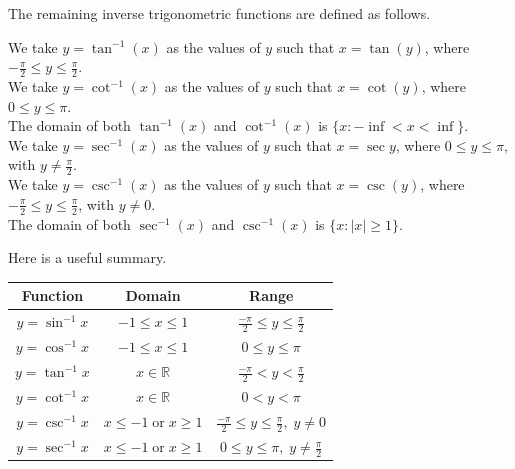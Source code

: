 \documentclass[compacto,10pt,comentarios]{aleph-notas}
\begin{document}
The remaining inverse trigonometric functions are defined as follows.
\begin{defi}
    We take $y = \tan^{-1}(x)$ as the values of $y$ such that $x = \tan(y)$, where $-\frac{\pi}{2} \leq y \leq \frac{\pi}{2}$. \\

    We take $y = \cot^{-1}(x)$ as the values of $y$ such that $x = \cot(y)$, where $0 \leq y \leq \pi$. \\

    The domain of both $\tan^{-1}(x)$ and $\cot^{-1}(x)$ is $\{ x: -\inf < x < \inf \}$. \\

    We take $y = \sec^{-1}(x)$ as the values of $y$ such that $x = \sec{y}$, where $0 \leq y \leq \pi$, with $y \neq \frac{\pi}{2}$. \\

    We take $y = \csc^{-1}(x)$ as the values of $y$ such that $x = \csc(y)$, where $-\frac{\pi}{2} \leq y \leq \frac{\pi}{2}$, with $y \neq 0$. \\

    The domain of both $\sec^{-1}(x)$ and $\csc^{-1}(x)$ is $\{x: |x| \geq 1 \}$.
\end{defi}

Here is a useful summary.
\begin{table}[h!]
    \centering
    \renewcommand{\arraystretch}{1.5}  %
    \begin{tabular}{|c|c|c|}
    \hline
    \textbf{Function} & \textbf{Domain} & \textbf{Range} \\
    \hline
    $y = \sin^{-1} x$   & $-1 \leq x \leq 1$ & $\frac{-\pi}{2} \leq y \leq \frac{\pi}{2}$ \\
    \hline
    $y = \cos^{-1} x$  & $-1 \leq x \leq 1$ & $0 \leq y \leq \pi$ \\
    \hline
    $y = \tan^{-1} x$ & $x \in \mathbb{R}$ & $\frac{-\pi}{2} < y < \frac{\pi}{2}$ \\
    \hline
    $y = \cot^{-1} x$  & $x \in \mathbb{R}$ & $0 < y < \pi$ \\
    \hline
    $y = \csc^{-1} x$   & $x \leq -1 \; \text{or} \; x \geq 1$ & $\frac{-\pi}{2} \leq y \leq \frac{\pi}{2}, \; y \neq 0$ \\
    \hline
    $y = \sec^{-1} x$  & $x \leq -1 \; \text{or} \; x \geq 1$ & $0 \leq y \leq \pi, \; y \neq \frac{\pi}{2}$ \\
    \hline
    \end{tabular}
\end{table}
\end{document}
